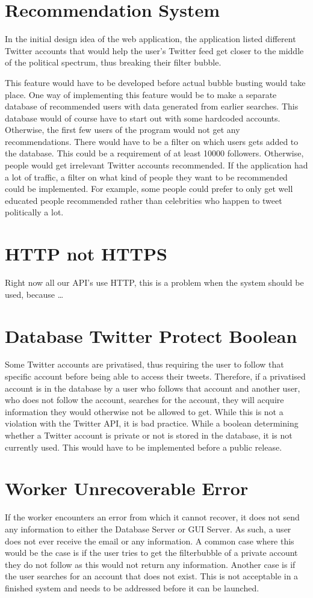 \section{Recommendation System}
In the initial design idea of the web application, the application listed
different Twitter accounts that would help the user's Twitter feed get closer to
the middle of the political spectrum, thus breaking their filter bubble. \nl

This feature would have to be developed before actual bubble busting would take
place. One way of implementing this feature would be to make a separate
database of recommended users with data generated from earlier searches. This
database would of course have to start out with some hardcoded accounts.
Otherwise, the first few users of the program would not get any
recommendations. There would have to be a filter on which users gets added to
the database. This could be a requirement of at least 10000 followers.
Otherwise, people would get irrelevant Twitter accounts recommended. If the
application had a lot of traffic, a filter on what kind of people they want to
be recommended could be implemented. For example, some people could prefer to
only get well educated people recommended rather than celebrities who happen to
tweet politically a lot.


\section{HTTP not HTTPS}
Right now all our \ac{API}'s use HTTP, this is a problem when the system should
be used, because \ldots {}


\section{Database Twitter Protect Boolean}\label{sec:twitterProtect}
Some Twitter accounts are privatised, thus requiring the user to follow that
specific account before being able to access their tweets. Therefore, if a
privatised account is in the database by a user who follows that account and
another user, who does not follow the account, searches for the account, they
will acquire information they would otherwise not be allowed to get. While this
is not a violation with the Twitter API, it is bad practice. While a boolean
determining whether a Twitter account is private or not is stored in the
database, it is not currently used. This would have to be implemented before a
public release.

\section{Worker Unrecoverable Error}
If the worker encounters an error from which it cannot recover, it does not send
any information to either the Database Server or GUI Server. As such, a user
does not ever receive the email or any information. A common case where this
would be the case is if the user tries to get the filterbubble of a private
account they do not follow as this would not return any information. Another
case is if the user searches for an account that does not exist. This is not
acceptable in a finished system and needs to be addressed before it can be launched.

